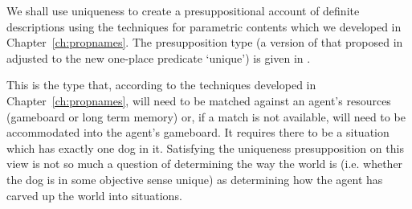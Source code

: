 We shall use uniqueness to create a presuppositional account of
definite descriptions using the techniques for parametric contents
which we developed in Chapter~\ref{ch:propnames}.  The presupposition
type (a version of that proposed in \citealp{Cooper2013b} adjusted to
the new one-place predicate `unique') is given in \nexteg{}.
\begin{ex} 
\label{ex:bgthedog}
\end{ex} 
This is the type that, according to the techniques developed in
Chapter~\ref{ch:propnames}, will need to be matched against an agent's
resources (gameboard or long term memory) or, if a match is not
available, will need to be accommodated into the agent's gameboard.
It requires there to be a situation which has exactly one dog in it.  Satisfying the uniqueness
presupposition on this view is not so much a question of determining
the way the world is (i.e. whether the dog is in some objective sense
unique) as determining how the agent has carved up the world into
situations.

